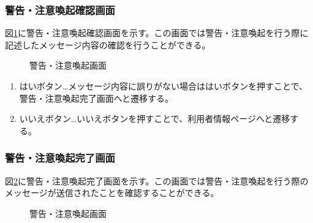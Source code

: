 \documentclass[a4j]{jarticle}
\begin{document}
\subsubsection{警告・注意喚起確認画面}
図\ref{fig:report_confirm}に警告・注意喚起確認画面を示す。この画面では警告・注意喚起を行う際に記述したメッセージ内容の確認を行うことができる。
\begin{figure}[H]
\centering
{}
\caption{警告・注意喚起画面}
\label{fig:report_confirm}
\end{figure}

\begin{enumerate}
  \renewcommand{\labelenumi}{\textcircled{\scriptsize \theenumi}}

\item はいボタン…メッセージ内容に誤りがない場合ははいボタンを押すことで、警告・注意喚起完了画面へと遷移する。
\item いいえボタン…いいえボタンを押すことで、利用者情報ページへと遷移する。

\end{enumerate}

\subsubsection{警告・注意喚起完了画面}
図\ref{fig:report_ok}に警告・注意喚起完了画面を示す。この画面では警告・注意喚起を行う際のメッセージが送信されたことを確認することができる。
\begin{figure}[H]
\centering
{}
\caption{警告・注意喚起画面}
\label{fig:report_ok}
\end{figure}
\end{document}
